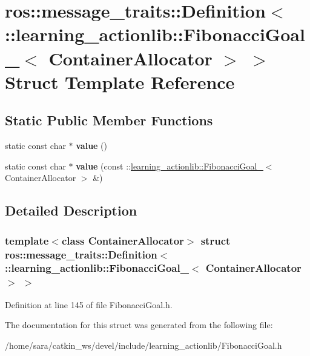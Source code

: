 \hypertarget{structros_1_1message__traits_1_1Definition_3_01_1_1learning__actionlib_1_1FibonacciGoal___3_01ContainerAllocator_01_4_01_4}{}\section{ros\+:\+:message\+\_\+traits\+:\+:Definition$<$ \+:\+:learning\+\_\+actionlib\+:\+:Fibonacci\+Goal\+\_\+$<$ Container\+Allocator $>$ $>$ Struct Template Reference}
\label{structros_1_1message__traits_1_1Definition_3_01_1_1learning__actionlib_1_1FibonacciGoal___3_01ContainerAllocator_01_4_01_4}
\subsection*{Static Public Member Functions}
\begin{DoxyCompactItemize}
\item 
\mbox{\label{structros_1_1message__traits_1_1Definition_3_01_1_1learning__actionlib_1_1FibonacciGoal___3_01ContainerAllocator_01_4_01_4_a341ea74007fb9930f0e691831e8933be}} 
static const char $\ast$ {\bfseries value} ()
\item 
\mbox{\label{structros_1_1message__traits_1_1Definition_3_01_1_1learning__actionlib_1_1FibonacciGoal___3_01ContainerAllocator_01_4_01_4_ad4c435a9dac8973304d6dea5691cc551}} 
static const char $\ast$ {\bfseries value} (const \+::\hyperlink{structlearning__actionlib_1_1FibonacciGoal__}{learning\+\_\+actionlib\+::\+Fibonacci\+Goal\+\_\+}$<$ Container\+Allocator $>$ \&)
\end{DoxyCompactItemize}


\subsection{Detailed Description}
\subsubsection*{template$<$class Container\+Allocator$>$\newline
struct ros\+::message\+\_\+traits\+::\+Definition$<$ \+::learning\+\_\+actionlib\+::\+Fibonacci\+Goal\+\_\+$<$ Container\+Allocator $>$ $>$}



Definition at line 145 of file Fibonacci\+Goal.\+h.



The documentation for this struct was generated from the following file\+:\begin{DoxyCompactItemize}
\item 
/home/sara/catkin\+\_\+ws/devel/include/learning\+\_\+actionlib/Fibonacci\+Goal.\+h\end{DoxyCompactItemize}
